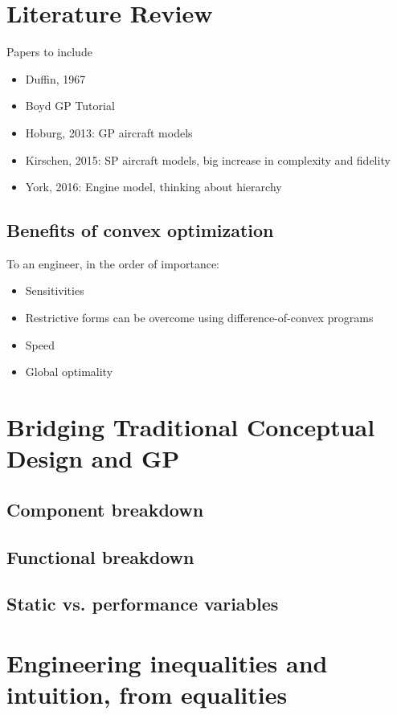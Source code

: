 \documentclass{aiaa-pretty}
\begin{document}
\section{Literature Review}
Papers to include
\begin{itemize}
\item Duffin, 1967
\item Boyd GP Tutorial
\item Hoburg, 2013: GP aircraft models
\item Kirschen, 2015: SP aircraft models, big increase in complexity and fidelity
\item York, 2016: Engine model, thinking about hierarchy
\end{itemize}
\subsection{Benefits of convex optimization}
To an engineer, in the order of importance:
\begin{itemize}
\item Sensitivities
\item Restrictive forms can be overcome using difference-of-convex programs
\item Speed
\item Global optimality
\end{itemize}

\section{Bridging Traditional Conceptual Design and \gls{GP}}

\subsection{Component breakdown}

\subsection{Functional breakdown}

\subsection{Static vs. performance variables}

\section{Engineering inequalities and intuition, from equalities}
\end{document}
